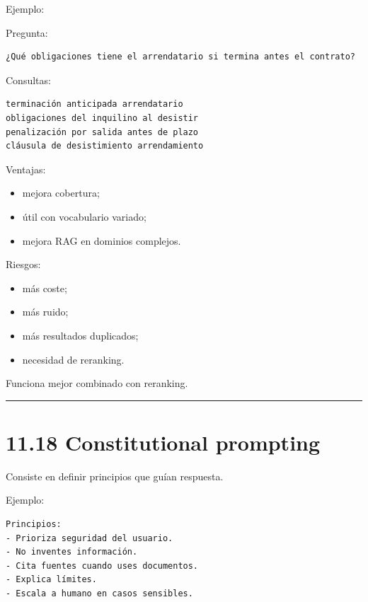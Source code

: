 Ejemplo:

Pregunta:

\begin{lstlisting}
¿Qué obligaciones tiene el arrendatario si termina antes el contrato?
\end{lstlisting}

Consultas:

\begin{lstlisting}
terminación anticipada arrendatario
obligaciones del inquilino al desistir
penalización por salida antes de plazo
cláusula de desistimiento arrendamiento
\end{lstlisting}

Ventajas:

\begin{itemize}
\tightlist
\item
  mejora cobertura;
\item
  útil con vocabulario variado;
\item
  mejora RAG en dominios complejos.
\end{itemize}

Riesgos:

\begin{itemize}
\tightlist
\item
  más coste;
\item
  más ruido;
\item
  más resultados duplicados;
\item
  necesidad de reranking.
\end{itemize}

Funciona mejor combinado con reranking.

\begin{center}\rule{0.5\linewidth}{0.5pt}\end{center}

\section{11.18 Constitutional prompting}\label{constitutional-prompting}

Consiste en definir principios que guían respuesta.

Ejemplo:

\begin{lstlisting}
Principios:
- Prioriza seguridad del usuario.
- No inventes información.
- Cita fuentes cuando uses documentos.
- Explica límites.
- Escala a humano en casos sensibles.
\end{lstlisting}

